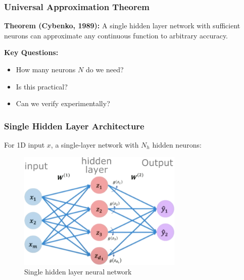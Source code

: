 \documentclass[notes]{beamer}
\begin{document}
\begin{frame}
\frametitle{Universal Approximation Theorem}

\textbf{Theorem (Cybenko, 1989):} A single hidden layer network with sufficient neurons can approximate any continuous function to arbitrary accuracy.


\textbf{Key Questions:}
\begin{itemize}
\item How many neurons $N$ do we need?
\item Is this practical?
\item Can we verify experimentally?
\end{itemize}

\end{frame}

\begin{frame}
\frametitle{Single Hidden Layer Architecture}

For 1D input $x$, a single-layer network with $N_h$ hidden neurons:


\begin{figure}[ht]
	\centering
	\includegraphics[width=0.7\textwidth]{figs/single-layer-nn2.png}
	\caption*{Single hidden layer neural network}
\end{figure}

\end{frame}
\end{document}
